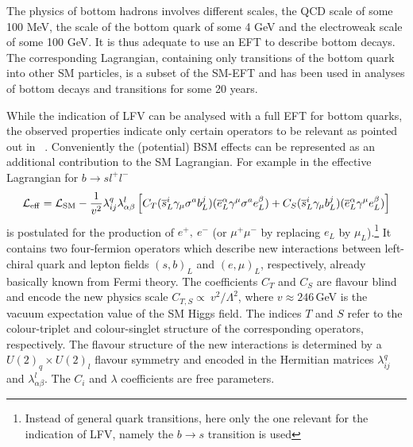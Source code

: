 The physics of bottom hadrons involves different scales, the QCD scale of
some 100 MeV, the scale of the bottom quark of some 4 GeV and the
electroweak scale of some 100 GeV. It is thus adequate to use an EFT to
describe bottom decays.  The corresponding Lagrangian, containing only
transitions of the bottom quark into other SM particles, is a subset
of the SM-EFT and has been used in analyses of bottom decays and
transitions for some 20 years.

While the indication of LFV can be analysed with a full EFT for bottom
quarks, the observed properties indicate only certain operators to be
relevant as pointed out in~ \citet{Buttazzo:2017ixm}. Conveniently the
(potential) BSM effects can be represented as an additional
contribution to the SM Lagrangian.  For example in
\citet{Buttazzo:2017ixm} the effective Lagrangian for
$b\rightarrow s l^+l^-$
\begin{equation}\label{eq:leff}
{\cal L}_{\rm eff} = {\cal L}_{\rm SM} - \frac{1}{v^2}\lambda^q_{ij}\lambda^l_{\alpha\beta}\left[C_T(\overline{s}^i_L\gamma_\mu\sigma^a b^j_L)(\overline{e}_L^\alpha\gamma^\mu\sigma^a e_L^\beta)+C_S(\overline{s}_L^i\gamma_\mu b_L^j)(\overline{e}_L^\alpha\gamma^\mu e_L^\beta)\right]
\end{equation}
is postulated for the production of $e^+,~e^-$ (or $\mu^+ \mu^-$ by
replacing $e_L$ by $\mu_L$).\footnote{Instead of general quark
  transitions, here only the one relevant for the indication of LFV,
  namely the $b\rightarrow s$ transition is used} It contains two
four-fermion operators which describe new interactions between
left-chiral quark and lepton fields $(s,b)_L$ and $(e,\mu )_L$,
respectively, already basically known from Fermi theory.  The
coefficients $C_T$ and $C_S$ are flavour blind and encode the new
physics scale $C_{T,S} \propto \ v^2/\Lambda^2$, where $v \approx
246$\,GeV is the vacuum expectation value of the SM Higgs field. The indices $T$ and $S$ refer
to the colour-triplet and colour-singlet structure of the
corresponding operators, respectively.  The flavour structure of the
new interactions is determined by a $U(2)_q\times U(2)_l$ flavour
symmetry and encoded in the Hermitian matrices $\lambda^q_{ij}$ and
$\lambda^l_{\alpha\beta}$. The $C_i$ and $\lambda $ coefficients are
free parameters.

